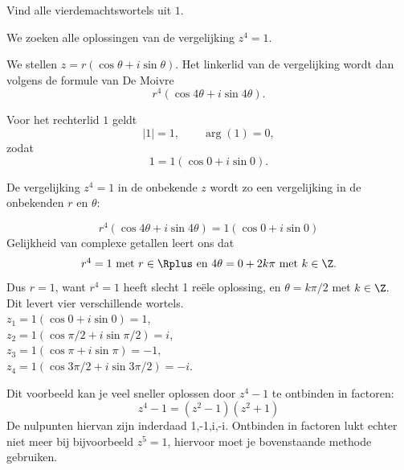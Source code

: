 \documentclass{ximera}
\begin{document}
\begin{example}
    Vind alle vierdemachtswortels uit $1$.
    \begin{oplossing}
    We zoeken alle oplossingen van de vergelijking $z^4=1.$
     
    We stellen $z = r(\cos\theta+i\sin\theta)$.
    Het linkerlid van de vergelijking wordt dan volgens de formule van De Moivre $$r^4(\cos 4\theta+i\sin 4\theta).$$
     
    Voor het rechterlid $1$ geldt
    \[ |1| = 1, \qquad \arg (1) = 0, \]
    zodat
    \[ 1 = 1(\cos 0+i\sin 0). \]
     
    De
    vergelijking $z^4=1$ in de onbekende $z$ wordt zo een vergelijking in de onbekenden $r$ en $\theta$:
     
    $$r^4(\cos 4\theta+i\sin 4\theta) =1(\cos 0+i\sin 0)$$
    Gelijkheid van complexe getallen leert ons dat $$\mbox{$r^4=1$ met $r\in \Rplus$ en
        $4\theta
        =0+2k\pi$ met $k\in \Z.$}$$ Dus $r=1$, want $r^4=1$ heeft slecht 1 reële oplossing, en $\theta=k\pi/2$ met $k\in
    \Z.$
    \\Dit levert vier verschillende wortels.
    \\$z_1=1(\cos 0+i\sin 0)=1$,
    \\$z_2=1(\cos \pi/2+i\sin \pi/2) =i$,
    \\$z_3=1 (\cos \pi+i\sin \pi) =-1,$
    \\$z_4=1 (\cos 3\pi/2+i\sin 3\pi/2)=-i.$
     
     
    Dit voorbeeld kan je veel sneller oplossen door $z^4-1$ te ontbinden in factoren:
    $$ z^4-1=(z^2-1)(z^2+1)$$
    De nulpunten hiervan zijn inderdaad 1,-1,i,-i. Ontbinden in factoren lukt echter niet meer bij bijvoorbeeld $z^5=1$, hiervoor moet je bovenstaande methode gebruiken.
    \end{oplossing}
    \end{example}
 
\end{document}
